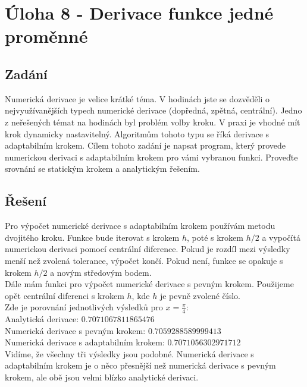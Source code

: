 \documentclass[a4paper,12pt]{article}
\begin{document}
	\section {Úloha 8 - Derivace funkce jedné proměnné}
	\subsection{Zadání}
Numerická derivace je velice krátké téma. V hodinách jste se dozvěděli o nejvyužívanějších typech numerické derivace (dopředná, zpětná, centrální). Jedno z neřešených témat na hodinách byl problém volby kroku. V praxi je vhodné mít krok dynamicky nastavitelný. Algoritmům tohoto typu se říká derivace s adaptabilním krokem. Cílem tohoto zadání je napsat program, který provede numerickou derivaci s adaptabilním krokem pro vámi vybranou funkci. Proveďte srovnání se statickým krokem a analytickým řešením.

\subsection{Řešení}
\justify
Pro výpočet numerické derivace s adaptabilním krokem používám metodu dvojitého kroku. Funkce bude iterovat s krokem $h$, poté s krokem $h/2$ a vypočítá numerickou derivaci pomocí centrální diference. Pokud je rozdíl mezi výsledky menší než zvolená tolerance, výpočet končí. Pokud není, funkce se opakuje s krokem $h/2$ a novým středovým bodem.\\
\justify
Dále mám funkci pro výpočet numerické derivace s pevným krokem. Použijeme opět centrální diferenci s krokem $h$, kde $h$ je pevně zvolené číslo.\\
\justify
Zde je porovnání jednotlivých výsledků pro $x=\frac{\pi}{4}$:\\
\justify
Analytická derivace: $0.7071067811865476$\\
Numerická derivace s pevným krokem: $0.7059288589999413$\\
Numerická derivace s adaptabilním krokem: $0.7071056302971712$\\
\justify
Vidíme, že všechny tři výsledky jsou podobné. Numerická derivace s adaptabilním krokem je o něco přesnější než numerická derivace s pevným krokem, ale obě jsou velmi blízko analytické derivaci.


	
\end{document}
